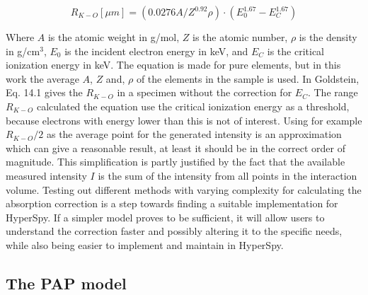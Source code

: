 \begin{equation}
    \label{eq:theory:quantitative:kanaya_okayama}
    R_{K-O} [\mu m] = (0.0276 A / Z ^{0.92} \rho) \cdot (E_0^{1.67} - E_C^{1.67})
\end{equation}

Where $A$ is the atomic weight in g/mol, $Z$ is the atomic number, $\rho$ is the density in g/cm$^3$, $E_0$ is the incident electron energy in keV, and $E_C$ is the critical ionization energy in keV.
The equation is made for pure elements, but in this work the average $A$, $Z$ and, $\rho$ of the elements in the sample is used.
In Goldstein, Eq. 14.1 gives the $R_{K-O}$ in a specimen without the correction for $E_C$.
The range $R_{K-O}$ calculated the equation use the critical ionization energy as a threshold, because electrons with energy lower than this is not of interest.
Using for example $R_{K-O}/2$ as the average point for the generated intensity is an approximation which can give a reasonable result, at least it should be in the correct order of magnitude.
This simplification is partly justified by the fact that the available measured intensity $I$ is the sum of the intensity from all points in the interaction volume.
Testing out different methods with varying complexity for calculating the absorption correction is a step towards finding a suitable implementation for HyperSpy.
If a simpler model proves to be sufficient, it will allow users to understand the correction faster and possibly altering it to the specific needs, while also being easier to implement and maintain in HyperSpy.












\subsection{The PAP model}
\label{theory:quantitative:pap}


